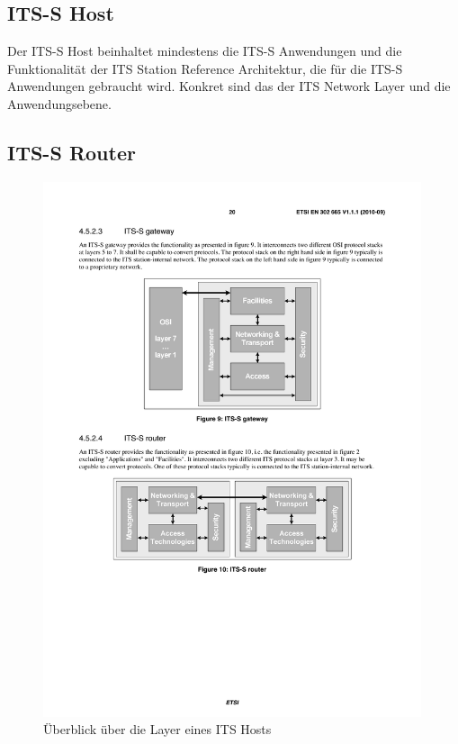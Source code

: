 \subsection{ITS-S Host}
Der ITS-S Host beinhaltet mindestens die ITS-S Anwendungen und die Funktionalität der ITS  Station Reference Architektur, die für die  ITS-S Anwendungen gebraucht wird. Konkret sind das der \ac{ITS} Network Layer und die Anwendungsebene. 


\subsection{ITS-S Router}


\begin{figure}
\includegraphics[width=0.99\textwidth]{content/images/01_funktionsweise/layer_router.pdf}
\caption{Überblick über die Layer eines ITS Hosts \cite{etsi2010302}}
\label{fig:funktionsweise_layerHost}
\end{figure}

